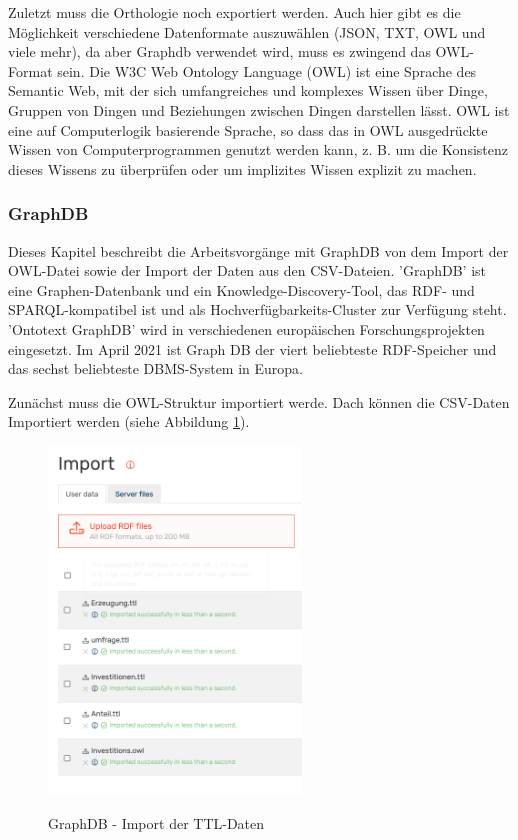 \documentclass[12pt]{article}
\begin{document}
Zuletzt muss die Orthologie noch exportiert werden. Auch hier gibt es die Möglichkeit verschiedene Datenformate auszuwählen (JSON, TXT, OWL und viele mehr), da aber Graphdb verwendet wird, muss es zwingend das OWL-Format sein. Die W3C Web Ontology Language (OWL) ist eine Sprache des Semantic Web, mit der sich umfangreiches und komplexes Wissen über Dinge, Gruppen von Dingen und Beziehungen zwischen Dingen darstellen lässt. OWL ist eine auf Computerlogik basierende Sprache, so dass das in OWL ausgedrückte Wissen von Computerprogrammen genutzt werden kann, z. B. um die Konsistenz dieses Wissens zu überprüfen oder um implizites Wissen explizit zu machen.

            \subsubsection{GraphDB}
            
Dieses Kapitel beschreibt die Arbeitsvorgänge mit GraphDB von dem Import der OWL-Datei sowie der Import der Daten aus den CSV-Dateien. 'GraphDB' ist eine Graphen-Datenbank und ein Knowledge-Discovery-Tool, das RDF- und SPARQL-kompatibel ist und als Hochverfügbarkeits-Cluster zur Verfügung steht. 'Ontotext GraphDB' wird in verschiedenen europäischen Forschungsprojekten eingesetzt. Im April 2021 ist Graph DB der viert beliebteste RDF-Speicher und das sechst beliebteste DBMS-System in Europa. 

Zunächst muss die OWL-Struktur importiert werde. Dach können die CSV-Daten Importiert werden (siehe Abbildung \ref{fig:graphimport}).

\begin{figure}[!ht]
    \caption{GraphDB - Import der TTL-Daten}
    \centering
    \includegraphics[width=0.6\textwidth]{images/graphdb_1.png}
    \label{fig:graphimport}
\end{figure}
\end{document}
